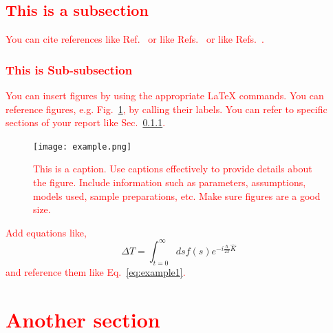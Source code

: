 \documentclass[aps,pra,a4paper,nofootinbib,preprint,12pt]{revtex4-1} %
\begin{document}
\subsection{\textcolor{red}{This is a subsection}}

\textcolor{red}{You can cite references like Ref.~\cite{smith2001} or like Refs.~\cite{smith2002,smith2003,smith2004,smith2005,smith2006,smith2007,smith2008,smith2009,smith2010,smith2011,smith2012} or like Refs.~\cite{smith2013,smith2014}.}

\subsubsection{\textcolor{red}{This is Sub-subsection}}
\label{sec:subssubsectionref} %

\textcolor{red}{You can insert figures by using the appropriate {\LaTeX} commands. You can reference figures, e.g. Fig.~\ref{fig:example1}, by calling their labels. You can refer to specific sections of your report like Sec.~\ref{sec:subssubsectionref}.}

\begin{figure}[b]
\texttt{[image: example.png]}
\caption[\textcolor{red}{Short Caption for List of Figures}]{\textcolor{red}{This is a caption. Use captions effectively to provide details about the figure. Include information such as parameters, assumptions, models used, sample preparations, etc. Make sure figures are a good size.}}
\label{fig:example1} %
\end{figure}

\textcolor{red}{Add equations like,}
\begin{equation}
\Delta T= \int_{t=0}^\infty ds f(s) e^{-i \frac{\hbar}{2\pi}\hat{K}}
\label{eq:example1} %
\end{equation}
\textcolor{red}{and reference them like Eq.~\ref{eq:example1}.}

\newpage
\section{\textcolor{red}{Another section}}
\end{document}
